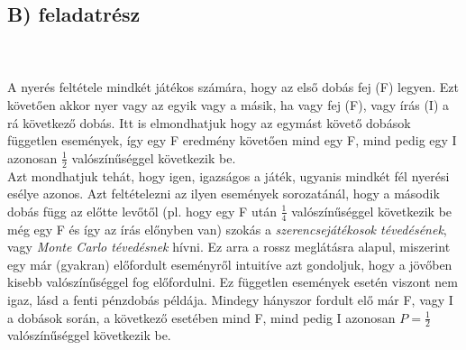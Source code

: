 \subsection*{B) feladatrész}
\\ \\
A nyerés feltétele mindkét játékos számára, hogy az első dobás fej (F) legyen. Ezt követően akkor nyer vagy az egyik vagy a másik, ha vagy fej (F), vagy írás (I) a rá következő dobás. Itt is elmondhatjuk hogy az egymást követő dobások független események, így egy F eredmény követően mind egy F, mind pedig egy I azonosan $\frac{1}{2}$ valószínűséggel következik be. \\
Azt mondhatjuk tehát, hogy igen, igazságos a játék, ugyanis mindkét fél nyerési esélye azonos. Azt feltételezni az ilyen események sorozatánál, hogy a második dobás függ az előtte levőtől (pl. hogy egy F után $\frac{1}{4}$ valószínűséggel következik be még egy F és így az írás előnyben van) szokás a \emph{szerencsejátékosok tévedésének}\cite{croson2005gambler}, vagy \emph{Monte Carlo tévedésnek} hívni. Ez arra a rossz meglátásra alapul, miszerint egy már (gyakran) előfordult eseményről intuitíve azt gondoljuk, hogy a jövőben kisebb valószínűséggel fog előfordulni. Ez független események esetén viszont nem igaz, lásd a fenti pénzdobás példája. Mindegy hányszor fordult elő már F, vagy I a dobások során, a következő esetében mind F, mind pedig I azonosan $P = \frac{1}{2}$ valószínűséggel következik be.